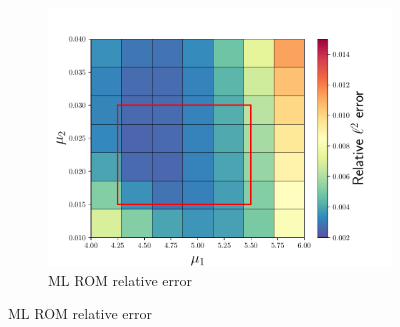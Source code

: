 \documentclass[3p,computermodern,10pt]{elsarticle}
\begin{document}
\begin{figure}
\begin{center}
\begin{subfigure}[t]{0.32\textwidth}
\includegraphics[trim={0cm 0cm 0cm 0cm},clip,width=1.0\linewidth]{code/burgers/synapse_models/elu/results/uml_error_vs_param.pdf} 
\caption{ML ROM relative error}
\end{subfigure}
\label{fig:rom_metrics_swe_updatefreq}
\end{center}
\end{figure}
\end{document}
